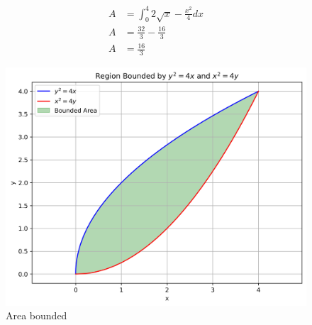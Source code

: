 \documentclass[journal]{IEEEtran}
\begin{document}
\begin{align}
A &= \int_{0}^{4}2\sqrt{x}-\frac{x^2}{4}dx\\
A &= \frac{32}{3}-\frac{16}{3}\\
A &= \frac{16}{3}
\end{align}
\begin{figure}[h!]
    \centering
    \includegraphics[width=0.7\linewidth]{figs/01.png}
    \caption{Area bounded}
    \label{fig:placeholder}
\end{figure}
\end{document}
